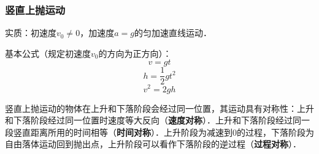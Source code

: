 \subsubsection{竖直上抛运动}
实质：初速度$v_0\neq0$，加速度$a=g$的匀加速直线运动．

基本公式（规定初速度$v_0$的方向为正方向）：
\begin{equation}
v=gt
\end{equation}
\begin{equation}
h=\frac12gt^2
\end{equation}
\begin{equation}
v^2=2gh
\end{equation}

竖直上抛运动的物体在上升和下落阶段会经过同一位置，其运动具有对称性：上升和下落阶段经过同一位置时速度等大反向（\textbf{速度对称}）．上升和下落阶段经过同一段竖直距离所用的时间相等（\textbf{时间对称}）．上升阶段为减速到0的过程，下落阶段为自由落体运动回到抛出点，上升阶段可以看作下落阶段的逆过程（\textbf{过程对称}）．